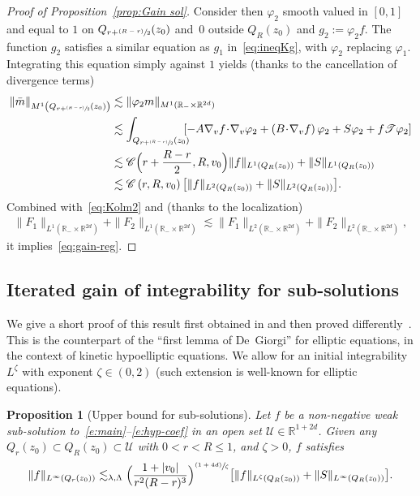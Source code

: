 \documentclass[JEP,XML,SOM,Unicode,NoFloatCountersInSection,published]{cedram}
\let\mathcal\mathscr
\newcommand{\psfrac}[2]{\sfrac{(#1)}{#2}}
\newtheorem{proposition}[theorem]{Proposition}
\theoremstyle{definition}
\theoremstyle{remark}
\newcommand\R{{\mathbb R}}
\newcommand{\cC}{\mathcal C}
\newcommand{\cU}{\mathcal{U}}
\newcommand{\cT}{\mathcal T}
\begin{document}
\begin{proof}[Proof of Proposition~\ref{prop:Gain sol}]
Consider then $\varphi_2$ smooth valued in $[0,1]$ and equal to
$1$ on $Q_{r+\psfrac{R-r}{2}}(z_0)$ and~$0$ outside $Q_R(z_0)$
and $g_2:=\varphi_2 f$. The function $g_2$ satisfies a similar
equation as $g_1$ in~\eqref{eq:ineqKg}, with $\varphi_2$
replacing $\varphi_1$. Integrating this equation simply against
$1$ yields (thanks to the cancellation of divergence terms)
\begin{align*}
\| \bar m \|_{M^1\left(Q_{r+\psfrac{R-r}{2}}(z_0)\right)}
& \lesssim
\| \varphi_2 m \|_{M^1(\R_- \times \R^{2d})} \\
& \lesssim \int_{Q_{r+\psfrac{R-r}{2}}(z_0)}
\hspace*{-2mm}[ -A\nabla_v
f\!\cdot\! \nabla_v \varphi_2 + \left( B \!\cdot\! \nabla_v f
\right)\varphi_2 + S\varphi_2 + f \cT \varphi_2] \\
& \lesssim \cC\Bigl(r+\frac{R-r}{2},R,v_0 \Bigr) \| f
\|_{L^1(Q_R(z_0))} + \| S \|_{L^1(Q_R(z_0))}\\
& \lesssim \cC\left(r,R,v_0
\right) \bigl[ \| f \|_{L^2(Q_R(z_0))} + \| S
\|_{L^2(Q_R(z_0))} \bigr].
\end{align*}
Combined with~\eqref{eq:Kolm2} and (thanks to the localization)
\begin{align*}
\| F_1 \|_{L^1(\R_- \times \R^{2d})} + \| F_2 \|_{L^1(\R_-
\times \R^{2d})} \lesssim \| F_1 \|_{L^2(\R_- \times
\R^{2d})} + \| F_2 \|_{L^2(\R_- \times \R^{2d})},
\end{align*}
it implies~\eqref{eq:gain-reg}.
\end{proof}

\subsection{Iterated gain of integrability for sub-solutions}

We give a short proof of this result first obtained in
\cite[Th.\,1.2]{pp} and then proved
differently~\cite[Th.\,12]{gimv}. This is the counterpart of
the ``first lemma of De~Giorgi'' for elliptic equations, in the
context of kinetic hypoelliptic equations. We allow for an
initial integrability~$L^\zeta$ with exponent $\zeta \in (0,2)$
(such extension is well-known for elliptic equations).

\begin{proposition}[Upper bound for sub-solutions]
\label{prop:1st lemma}
Let $f$ be a non-negative weak sub-solution
to~\eqref{e:main}--\eqref{e:hyp-coef} in an open set
$\cU \in \R^{1+2d}$. Given any
$Q_r(z_0) \subset Q_R(z_0) \subset \cU$ with $0<r<R \le 1$, and
$\zeta >0$, $f$ satisfies
\begin{equation*}
\| f \|_{L^\infty(Q_r(z_0))} \lesssim_{\lambda,\Lambda}
\Bigl( \frac{1+|v_0|}{r^2(R-r)^3}\Bigr)^{\psfrac{1+4d}{\zeta}}
\bigl[ \|f\|_{L^\zeta(Q_R(z_0))} + \|S\|_{L^\infty(Q_R(z_0))} \bigr].
\end{equation*}
\end{proposition}
\end{document}
